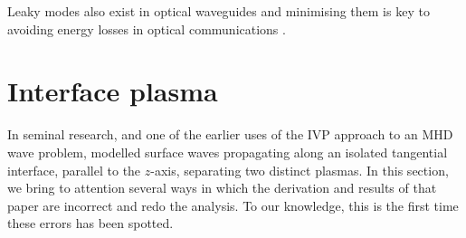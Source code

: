 \documentclass[12pt, draft]{../style-files/ociamthesis}
\begin{document}
Leaky modes also exist in optical waveguides and minimising them is key to avoiding energy losses in optical communications \cite{hu_etal09}.

\color{black}

\section{Interface plasma}
\label{sec: IVP int}

In seminal research, and one of the earlier uses of the IVP approach to an MHD wave problem, \cite{rae_etal81} modelled surface waves propagating along an isolated tangential interface, parallel to the $z$-axis, separating two distinct plasmas. In this section, we bring to attention several ways in which the derivation and results of that paper are incorrect and redo the analysis. To our knowledge, this is the first time these errors has been spotted.
\end{document}
